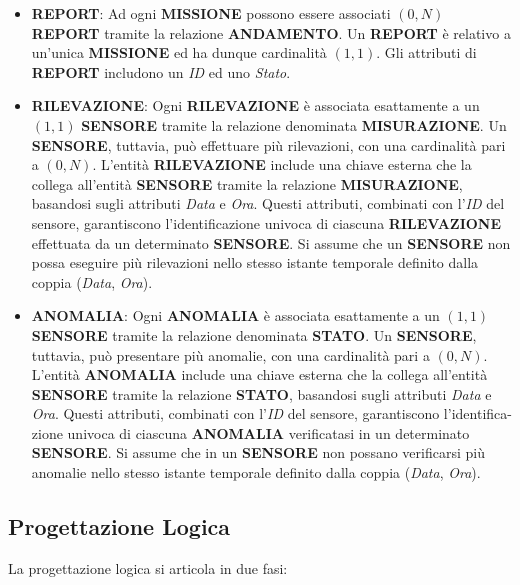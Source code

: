 \begin{itemize}
    \item \textbf{REPORT}: Ad ogni \textbf{MISSIONE} possono essere associati $(0,N)$ \textbf{REPORT} tramite la relazione \textbf{ANDAMENTO}. Un \textbf{REPORT} è relativo a un'unica \textbf{MISSIONE} ed ha dunque cardinalità $(1,1)$. Gli attributi di \textbf{REPORT} includono un \textit{ID} ed uno \textit{Stato}.
    
    \item \textbf{RILEVAZIONE}: Ogni \textbf{RILEVAZIONE} è associata esattamente a un $(1,1)$ \textbf{SENSORE} tramite la relazione denominata \textbf{MISURAZIONE}. Un \textbf{SENSORE}, tuttavia, può effettuare più rilevazioni, con una cardinalità pari a $(0,N)$. L'entità \textbf{RILEVAZIONE} include una chiave esterna che la collega all'entità \textbf{SENSORE} tramite la relazione \textbf{MISURAZIONE}, basandosi sugli attributi \textit{Data} e \textit{Ora}. Questi attributi, combinati con l'\textit{ID} del sensore, garantiscono l’identificazione univoca di ciascuna \textbf{RILEVAZIONE} effettuata da un determinato \textbf{SENSORE}. Si assume che un \textbf{SENSORE} non possa eseguire più rilevazioni nello stesso istante temporale definito dalla coppia (\textit{Data}, \textit{Ora}).
    
    \item \textbf{ANOMALIA}: Ogni \textbf{ANOMALIA} è associata esattamente a un $(1,1)$ \textbf{SENSORE} tramite la relazione denominata \textbf{STATO}. Un \textbf{SENSORE}, tuttavia, può presentare più anomalie, con una cardinalità pari a $(0,N)$. L'entità \textbf{ANOMALIA} include una chiave esterna che la collega all'entità \textbf{SENSORE} tramite la relazione \textbf{STATO}, basandosi sugli attributi \textit{Data} e \textit{Ora}. Questi attributi, combinati con l'\textit{ID} del sensore, garantiscono l'identifica-zione univoca di ciascuna \textbf{ANOMALIA} verificatasi in un determinato \textbf{SENSORE}. Si assume che in un \textbf{SENSORE} non possano verificarsi più anomalie nello stesso istante temporale definito dalla coppia (\textit{Data}, \textit{Ora}).
\end{itemize}


\subsection{Progettazione Logica}

La progettazione logica si articola in due fasi:

